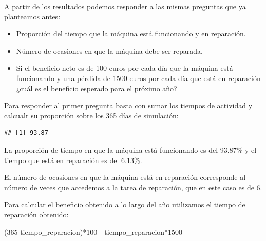 \documentclass[
]{book}
\newenvironment{Shaded}{\begin{snugshade}}{\end{snugshade}}
\newcommand{\DecValTok}[1]{\textcolor[rgb]{0.00,0.00,0.81}{#1}}
\newcommand{\FunctionTok}[1]{\textcolor[rgb]{0.00,0.00,0.00}{#1}}
\newcommand{\NormalTok}[1]{#1}
\newcommand{\OtherTok}[1]{\textcolor[rgb]{0.56,0.35,0.01}{#1}}
\newcommand{\SpecialCharTok}[1]{\textcolor[rgb]{0.00,0.00,0.00}{#1}}
\providecommand{\tightlist}{%
  \setlength{\itemsep}{0pt}\setlength{\parskip}{0pt}}
\theoremstyle{definition}
\theoremstyle{definition}
\theoremstyle{definition}
\theoremstyle{definition}
\theoremstyle{remark}
\begin{document}
A partir de los resultados podemos responder a las mismas preguntas que ya planteamos antes:

\begin{itemize}
\tightlist
\item
  Proporción del tiempo que la máquina está funcionando y en reparación.
\item
  Número de ocasiones en que la máquina debe ser reparada.
\item
  Si el beneficio neto es de 100 euros por cada día que la máquina está funcionando y una pérdida de 1500 euros por cada día que está en reparación ¿cuál es el beneficio esperado para el próximo año?
\end{itemize}

Para responder al primer pregunta basta con sumar los tiempos de actividad y calcualr su proporción sobre los 365 días de simulación:

\begin{Shaded}
\end{Shaded}

\begin{verbatim}
## [1] 93.87
\end{verbatim}

La proporción de tiempo en que la máquina está funcionando es del 93.87\% y el tiempo que está en reparación es del 6.13\%.

El número de ocasiones en que la máquina está en reparación corresponde al número de veces que accedemos a la tarea de reparación, que en este caso es de 6.

Para calcular el beneficio obtenido a lo largo del año utilizamos el tiempo de reparación obtenido:

\begin{Shaded}
\begin{Highlighting}[]
\NormalTok{(}\DecValTok{365}\SpecialCharTok{{-}}\NormalTok{tiempo\_reparacion)}\SpecialCharTok{*}\DecValTok{100} \SpecialCharTok{{-}}\NormalTok{ tiempo\_reparacion}\SpecialCharTok{*}\DecValTok{1500}
\end{Highlighting}
\end{Shaded}
\end{document}
